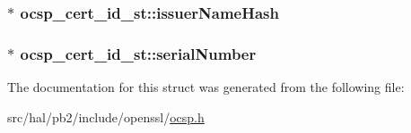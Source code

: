 \subsubsection[{\texorpdfstring{issuer\+Name\+Hash}{issuerNameHash}}]{$\ast$ ocsp\+\_\+cert\+\_\+id\+\_\+st\+::issuer\+Name\+Hash}\hypertarget{structocsp__cert__id__st_a778948e91d91afbfd895f5a3860d8d67}{}\label{structocsp__cert__id__st_a778948e91d91afbfd895f5a3860d8d67}
\subsubsection[{\texorpdfstring{serial\+Number}{serialNumber}}]{$\ast$ ocsp\+\_\+cert\+\_\+id\+\_\+st\+::serial\+Number}\hypertarget{structocsp__cert__id__st_a2385792d7888751bddbaa0dc150e9fbd}{}\label{structocsp__cert__id__st_a2385792d7888751bddbaa0dc150e9fbd}


The documentation for this struct was generated from the following file\+:\begin{DoxyCompactItemize}
\item 
src/hal/pb2/include/openssl/\hyperlink{ocsp_8h}{ocsp.\+h}\end{DoxyCompactItemize}
